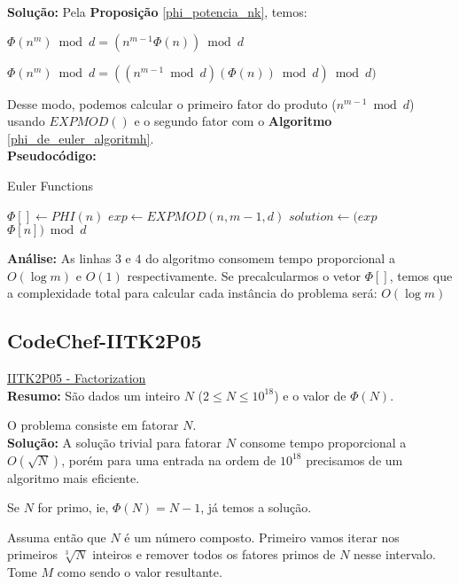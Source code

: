 \textbf{Solução:}
Pela \textbf{Proposição} \autoref{phi_potencia_nk}, temos: 

$\Phi(n^m) \bmod d = (n^{m-1}\Phi(n)) \bmod d$

$\Phi(n^m) \bmod d = ((n^{m-1} \bmod d)(\Phi(n)) \bmod d) \bmod d)$

Desse modo, podemos calcular o primeiro fator do produto ($n^{m-1} \bmod d$) usando $EXPMOD()$ e o segundo fator com o \textbf{Algoritmo} \autoref{phi_de_euler_algoritmh}.
\\

\textbf{Pseudocódigo:}
\begin{algorithm}
\caption{Euler Functions}
\begin{algorithmic}[1]
\State $\Phi[] \gets PHI(n)$
\State $exp \gets EXPMOD(n, m-1, d)$
\State $solution \gets (exp$ $\Phi[n]) \bmod d$
\State {}
\EndProcedure
\end{algorithmic}
\end{algorithm}

\textbf{Análise:}
As linhas $3$ e $4$ do algoritmo consomem tempo proporcional a $O(\log m)$ e $O(1)$ respectivamente.
Se precalcularmos o vetor $\Phi[]$, temos que a complexidade total para calcular cada instância do problema será: $O(\log m)$ 



\subsection{CodeChef-IITK2P05}
\href{https://www.codechef.com/problems/IITK2P05}{IITK2P05 - Factorization}\\

\textbf{Resumo:}
São dados um inteiro $N$ ($2 \leq N \leq 10^{18}$) e o valor de $\Phi(N)$.

O problema consiste em fatorar $N$. 
\\

\textbf{Solução:}
A solução trivial para fatorar $N$ consome tempo proporcional a $O(\sqrt{N})$, porém para uma entrada na ordem de $10^{18}$ precisamos de um algoritmo mais eficiente.

Se $N$ for primo, ie, $\Phi(N) = N-1$, já temos a solução.

Assuma então que $N$ é um número composto. Primeiro vamos iterar nos primeiros $\sqrt[3]{N}$ inteiros e remover todos os fatores primos de $N$ nesse intervalo. Tome $M$ como sendo o valor resultante.


